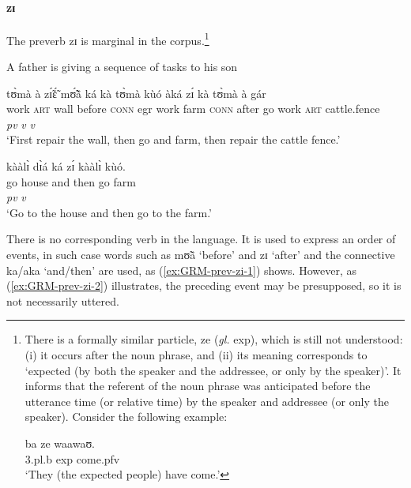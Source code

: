 \begin{exe}
\begin{exe}
\begin{exe}
{\begin{exe}
\begin{exe}
\begin{exe}
\begin{exe}
\begin{exe}
\begin{exe}
\begin{exe}
\begin{exe}
\begin{exe}
\begin{exe}
\begin{exe}
\begin{exe}
\begin{exe}
\begin{exe}
\begin{exe}
\begin{exe}
\begin{exe}
\begin{exe}
\begin{exe}
\begin{exe}
\paragraph{zɪ}
\label{sec:GRM-preverb-after-then}

The preverb {\sls zɪ} is marginal in the corpus.\footnote{There is a formally 
similar particle, {\sls ze}  ({\it gl.} {\sc exp}),  which is still not
understood: (i) it occurs after the noun phrase, and  (ii) its meaning
corresponds to
 `expected (by both the speaker and the
addressee, or only by the speaker)'. It informs that the referent of
the noun phrase was anticipated before the utterance time (or relative time) by
the speaker and addressee (or only the speaker).  Consider  the following
example:

\ea\gll ba ze  waawaʊ.\\
{\sc 3.pl.b} {\sc  exp} come.{\sc pfv}\\
`They (the expected people) have come.'
\z
}  



\ea
\ea\label{ex:GRM-prev-zi-1}  {\rm A father is giving a sequence of tasks to
his son}

 \glll tʊ̀mà  à  zɪ̃́ɛ̃́  mʊ̃́ã̀  ká  kà  tʊ̀mà  kùó   àká   zɪ́ kà  
tʊ̀mà à  gár\\
  {work} \textsc{art} {wall} {before}  \textsc{conn} {\sc egr} {work}
{farm} 
\textsc{conn} {after}  {go} {work} \textsc{art} {cattle.fence}\\  
{} {} {} {} {}  {} {} {} {} {\it pv} {\it v} {\it v} {} {}\\
\glt  `First repair the wall, then go and farm, then repair the cattle fence.'


 \ex\label{ex:GRM-prev-zi-2}
  \glll kààlɪ̀ dɪ̀á ká zɪ́ kààlɪ̀ kùó.\\
go  house and then go farm\\
{} {} {}  {\it pv} {\it v} {}\\
 \glt `Go to the house and then go to the farm.'


\z 
 \z


There is no corresponding verb in the language.   It is used to express an 
order of events,  in such case words such as {\sls mʊ̃ã}  `before' and {\sls 
zɪ} `after' and the connective {\sls ka/aka}  `and/then' are used, as 
(\ref{ex:GRM-prev-zi-1}) shows. However,  as (\ref{ex:GRM-prev-zi-2}) 
illustrates,  the preceding event may be presupposed, so  it is not necessarily 
uttered.








\end{exe}
\end{exe}
\end{exe}
\end{exe}
\end{exe}
\end{exe}
\end{exe}
\end{exe}
\end{exe}
\end{exe}
\end{exe}
\end{exe}
\end{exe}
\end{exe}
\end{exe}
\end{exe}
\end{exe}
\end{exe}
\end{exe}
\end{exe}}
\end{exe}
\end{exe}
\end{exe}
